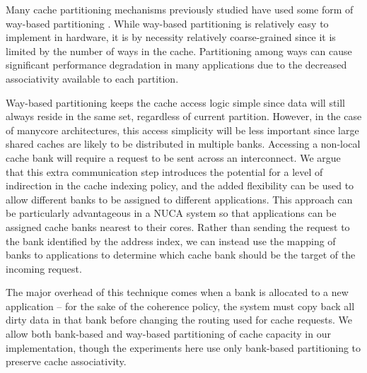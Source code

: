 %

%

%

%

Many cache partitioning mechanisms previously studied have used some form of way-based partitioning \cite{1331730,1152161,605420,1250671,1194855,1086328,1399982}.  While way-based partitioning is relatively easy to implement in hardware, it is by necessity relatively coarse-grained since it is limited by the number of ways in the cache.  Partitioning among ways can cause significant performance degradation in many applications due to the decreased associativity available to each partition.

Way-based partitioning keeps the cache access logic simple since data will still always reside in the same set, regardless of current partition.  However, in the case of manycore architectures, this access simplicity will be less important since large shared caches are likely to be distributed in multiple banks.  Accessing a non-local cache bank will require a request to be sent across an interconnect. We argue that this extra communication step introduces the potential for a level of indirection in the cache indexing policy, and the added flexibility can be used to allow different banks to be assigned to different applications. This approach can be particularly advantageous in a NUCA system so that applications can be assigned cache banks nearest to their cores. Rather than sending the request to the bank identified by the address index, we can instead use the mapping of banks to applications to determine which cache bank should be the target of the incoming request.

The major overhead of this technique comes when a bank is allocated to a new application -- for the sake of the coherence policy, the system must copy back all dirty data in that bank before changing the routing used for cache requests.  We allow both bank-based and way-based partitioning of cache capacity in our implementation, though the experiments here use only bank-based partitioning to preserve cache associativity.


